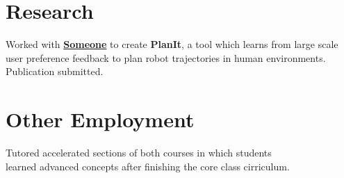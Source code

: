\documentclass[letterpaper]{deedy-resume} %
\begin{document}
\begin{minipage}[t]{0.66\textwidth}
\section{Research}


Worked with \textbf{\href{http://www.cs.cornell.edu/~ashesh/}{Someone}} to create \textbf{PlanIt}, a tool which learns from large scale user preference feedback to plan robot trajectories in human environments. Publication submitted.

\sectionspace %

\section{Other Employment}

\vspace{\topsep} %
\begin{tightitemize}

\item Tutored accelerated sections of both courses in which students \\
learned advanced concepts after finishing the core class cirriculum.
\end{tightitemize}                                                 

\sectionspace %


\end{minipage} %
\end{document}
